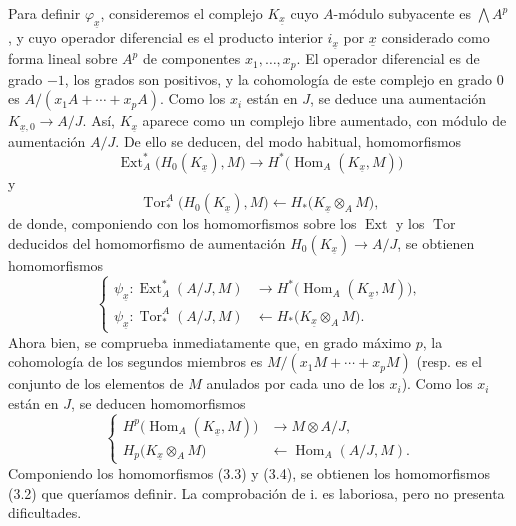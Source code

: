 \documentclass[11pt,twoside,openany]{book}
\numberwithin{equation}{section}
\theoremstyle{plain}
\theoremstyle{definition}
\theoremstyle{remark}
\theoremstyle{plain}
\theoremstyle{definition}
\theoremstyle{remark}
\begin{document}
Para definir $\varphi_{\underline{x}}$, consideremos el complejo
$K_{\underline{x}}$ cuyo $A$-módulo subyacente es $\bigwedge A^{p}$, y
cuyo operador diferencial es el producto interior $i_{\underline{x}}$ por
$\underline{x}$ considerado como forma lineal sobre $A^{p}$ de componentes
$x_1,\ldots,x_p$. El operador diferencial es de grado $-1$, los grados son
positivos, y la cohomología de este complejo en grado $0$ es
$A/(x_1A+\cdots+x_pA)$. Como los $x_i$ están en $J$, se deduce una
aumentación $K_{\underline{x},0}\longrightarrow A/J$. Así,
$K_{\underline{x}}$ aparece como un complejo libre aumentado, con módulo
de aumentación $A/J$. De ello se deducen, del modo habitual, homomorfismos
\[
\operatorname{Ext}_{A}^{*}\bigl(H_0(K_{\underline{x}}),M\bigr)
\longrightarrow
H^{*}\bigl(\operatorname{Hom}_{A}(K_{\underline{x}},M)\bigr)
\]
y
\[
\operatorname{Tor}_{*}^{A}\bigl(H_0(K_{\underline{x}}),M\bigr)
\longleftarrow
H_{*}\bigl(K_{\underline{x}}\otimes_A M\bigr),
\]
de donde, componiendo con los homomorfismos sobre los $\operatorname{Ext}$ y los
$\operatorname{Tor}$ deducidos del homomorfismo de aumentación
$H_0(K_{\underline{x}})\longrightarrow A/J$, se obtienen homomorfismos
\begin{equation}\tag{3.3}
\left\{
\begin{aligned}
\psi_{\underline{x}}:
\operatorname{Ext}_{A}^{*}(A/J,M)
&\longrightarrow H^{*}\bigl(\operatorname{Hom}_{A}(K_{\underline{x}},M)\bigr),\\
\psi_{\underline{x}}:
\operatorname{Tor}_{*}^{A}(A/J,M)
&\longleftarrow H_{*}\bigl(K_{\underline{x}}\otimes_A M\bigr).
\end{aligned}
\right.
\end{equation}
Ahora bien, se comprueba inmediatamente que, en grado máximo $p$, la cohomología de los segundos
miembros es $M/(x_1M+\cdots+x_pM)$ (resp. es el conjunto de los elementos de $M$
anulados por cada uno de los $x_i$). Como los $x_i$ están en $J$, se deducen
homomorfismos
\begin{equation}\tag{3.4}
\left\{
\begin{aligned}
H^{p}\bigl(\operatorname{Hom}_{A}(K_{\underline{x}},M)\bigr)
&\longrightarrow M\otimes A/J,\\
H_{p}\bigl(K_{\underline{x}}\otimes_A M\bigr)
&\longleftarrow\operatorname{Hom}_{A}(A/J,M).
\end{aligned}
\right.
\end{equation}
Componiendo los homomorfismos (3.3) y (3.4), se obtienen los homomorfismos (3.2)
que queríamos definir. La comprobación de i. es laboriosa, pero no
presenta dificultades.
\end{document}
